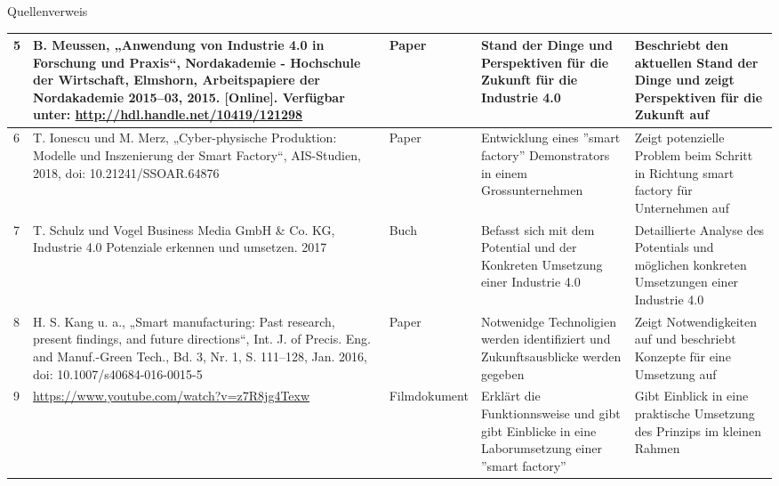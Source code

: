\documentclass{article}
\begin{document}
\begin{Map}{Quellenverweis}
{\begin{tabular}{p{0.2cm}p{4.2cm}p{2cm}p{3.2cm}p{3.2cm}}
 5& 
 B. Meussen, „Anwendung von Industrie 4.0 in Forschung und Praxis“, Nordakademie - Hochschule der Wirtschaft, Elmshorn, Arbeitspapiere der Nordakademie 2015–03,  2015. [Online]. Verfügbar unter: \url{http://hdl.handle.net/10419/121298} & 
 Paper & 
 Stand der Dinge und Perspektiven für die Zukunft für die Industrie 4.0 & 
 Beschriebt den aktuellen Stand der Dinge und zeigt Perspektiven für die Zukunft auf\\\midrule
 
 6& 
 T. Ionescu und M. Merz, „Cyber-physische Produktion: Modelle und Inszenierung der Smart Factory“, AIS-Studien, 2018, doi: 10.21241/SSOAR.64876 &
 Paper & 
 Entwicklung eines ''smart factory'' Demonstrators in einem Grossunternehmen & 
 Zeigt potenzielle Problem beim Schritt in Richtung smart factory für Unternehmen auf\\\midrule
 
 7& 
 T. Schulz und Vogel Business Media GmbH \& Co. KG, Industrie 4.0 Potenziale erkennen und umsetzen. 2017 &
 Buch & 
 Befasst sich mit dem Potential und der Konkreten Umsetzung einer Industrie 4.0 & 
 Detaillierte Analyse des Potentials und möglichen konkreten Umsetzungen einer Industrie 4.0\\\midrule
 
 8& 
 H. S. Kang u. a., „Smart manufacturing: Past research, present findings, and future directions“, Int. J. of Precis. Eng. and Manuf.-Green Tech., Bd. 3, Nr. 1, S. 111–128, Jan. 2016, doi: 10.1007/s40684-016-0015-5 & 
 Paper & 
 Notwenidge Technoligien werden identifiziert und Zukunftsausblicke werden gegeben & 
 Zeigt Notwendigkeiten auf und beschriebt Konzepte für eine Umsetzung auf\\\midrule
 
 9& 
 \url{https://www.youtube.com/watch?v=z7R8jg4Texw} &
 Filmdokument & 
 Erklärt die Funktionnsweise und gibt gibt Einblicke in eine Laborumsetzung einer ''smart factory'' & 
 Gibt Einblick in eine praktische Umsetzung des Prinzips im kleinen Rahmen\\\midrule
 

\end{tabular}}
\end{Map}
\end{document}
